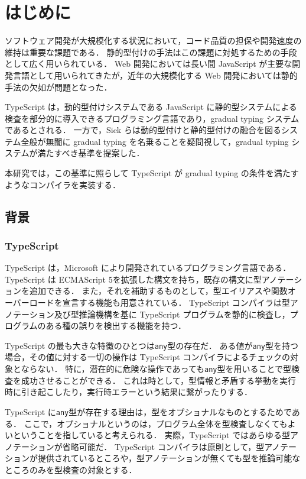 \chapter{はじめに}

ソフトウェア開発が大規模化する状況において，コード品質の担保や開発速度の維持は重要な課題である．
静的型付けの手法はこの課題に対処するための手段として広く用いられている．
Web 開発においては長い間 JavaScript が主要な開発言語として用いられてきたが，近年の大規模化する Web 開発においては静的手法の欠如が問題となった．

TypeScript は，動的型付けシステムである JavaScript に静的型システムによる検査を部分的に導入できるプログラミング言語であり，gradual typing システムであるとされる．
一方で，Siek らは動的型付けと静的型付けの融合を図るシステム全般が無闇に gradual typing を名乗ることを疑問視して，gradual typing システムが満たすべき基準を提案した．

本研究では，この基準に照らして TypeScript が gradual typing の条件を満たすようなコンパイラを実装する．

\section{背景}

\subsection{TypeScript}

TypeScript は，Microsoft により開発されているプログラミング言語である．
TypeScript は ECMAScript 5\cite{ES5}を拡張した構文を持ち，既存の構文に型アノテーションを追加できる．
また，それを補助するものとして，型エイリアスや関数オーバーロードを宣言する機能も用意されている．
TypeScript コンパイラは型アノテーション及び型推論機構を基に TypeScript プログラムを静的に検査し，プログラムのある種の誤りを検出する機能を持つ．

TypeScript の最も大きな特徴のひとつは\texttt{any}型の存在だ．
ある値が\texttt{any}型を持つ場合，その値に対する一切の操作は TypeScript コンパイラによるチェックの対象とならない．
特に，潜在的に危険な操作であっても\texttt{any}型を用いることで型検査を成功させることができる．
これは時として，型情報と矛盾する挙動を実行時に引き起こしたり，実行時エラーという結果に繋がったりする．

TypeScript に\texttt{any}型が存在する理由は，型をオプショナルなものとするためである．
ここで，オプショナルというのは，プログラム全体を型検査しなくてもよいということを指していると考えられる．
実際，TypeScript ではあらゆる型アノテーションが省略可能だ．
TypeScript コンパイラは原則として，型アノテーションが提供されているところや，型アノテーションが無くても型を推論可能なところのみを型検査の対象とする．

